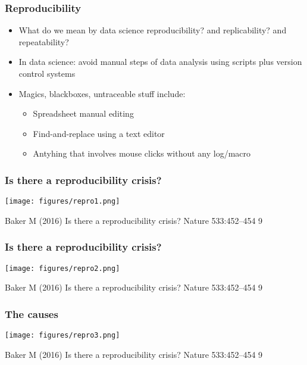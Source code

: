 \documentclass{beamer}
\begin{document}
\begin{frame}
  \frametitle{Reproducibility}
  \begin{itemize}
  \item What do we mean by data science reproducibility? and replicability? and repeatability?
  \item In data science: avoid manual steps of data analysis using scripts plus version control systems
  \item Magics, blackboxes, untraceable stuff include:
    \begin{itemize}
    \item Spreadsheet manual editing
    \item Find-and-replace using a text editor
    \item Antyhing that involves mouse clicks without any log/macro
    \end{itemize}
  \end{itemize}

\end{frame}




\begin{frame}
  \frametitle{Is there a reproducibility crisis?}
\centering
\texttt{[image: figures/repro1.png]}

{\tiny Baker M (2016) Is there a reproducibility crisis? Nature 533:452–454 9}
\end{frame}


\begin{frame}
  \frametitle{Is there a reproducibility crisis?}
\centering
\texttt{[image: figures/repro2.png]}

{\tiny Baker M (2016) Is there a reproducibility crisis? Nature 533:452–454 9}
\end{frame}

\begin{frame}
  \frametitle{The causes}
\centering
\texttt{[image: figures/repro3.png]}

{\tiny Baker M (2016) Is there a reproducibility crisis? Nature 533:452–454 9}
\end{frame}
\end{document}
